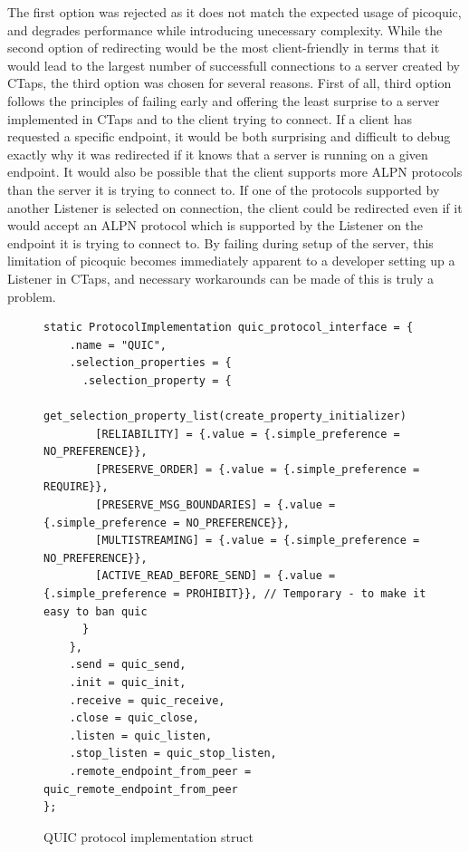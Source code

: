 The first option was rejected as it does not match the expected usage
of picoquic, and degrades performance while introducing unecessary complexity.
While the second option of redirecting would be the most client-friendly
in terms that it would lead to the largest number of successfull connections
to a server created by CTaps, the third option was chosen for several reasons.
First of all, third option follows the principles of failing early and offering
the least surprise to a server implemented in CTaps and to the client trying to
connect. If a client has requested a specific endpoint, it would be both surprising
and difficult to debug exactly why it was redirected if it knows that a server
is running on a given endpoint. It would also be possible that the client
supports more ALPN protocols than the server it is trying to connect to. If
one of the protocols supported by another Listener is selected on connection,
the client could be redirected even if it would accept an ALPN protocol which
is supported by the Listener on the endpoint it is trying to connect to.
By failing during setup of the server, this limitation of picoquic becomes
immediately apparent to a developer setting up a Listener in CTaps, and
necessary workarounds can be made of this is truly a problem.

\begin{figure}[H]
\begin{verbatim}
static ProtocolImplementation quic_protocol_interface = {
    .name = "QUIC",
    .selection_properties = {
      .selection_property = {
        get_selection_property_list(create_property_initializer)
        [RELIABILITY] = {.value = {.simple_preference = NO_PREFERENCE}},
        [PRESERVE_ORDER] = {.value = {.simple_preference = REQUIRE}},
        [PRESERVE_MSG_BOUNDARIES] = {.value = {.simple_preference = NO_PREFERENCE}},
        [MULTISTREAMING] = {.value = {.simple_preference = NO_PREFERENCE}},
        [ACTIVE_READ_BEFORE_SEND] = {.value = {.simple_preference = PROHIBIT}}, // Temporary - to make it easy to ban quic
      }
    },
    .send = quic_send,
    .init = quic_init,
    .receive = quic_receive,
    .close = quic_close,
    .listen = quic_listen,
    .stop_listen = quic_stop_listen,
    .remote_endpoint_from_peer = quic_remote_endpoint_from_peer
};
\end{verbatim}
\caption{QUIC protocol implementation struct}
\end{figure} 


